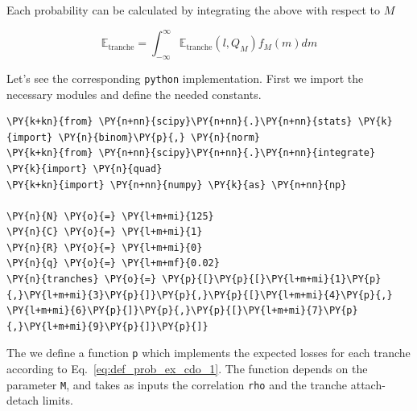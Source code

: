 Each probability can be calculated by integrating the above with respect to $M$
	
\begin{equation} \mathbb{E}_{\mathrm{tranche}} = \int_{-\infty}^{\infty}{\mathbb{E}_{\mathrm{tranche}}(l, Q_M) f_M(m)dm}\end{equation}

Let's see the corresponding \texttt{python} implementation.
First we import the necessary modules and define the needed constants.

\begin{tcolorbox}[breakable, size=fbox, boxrule=1pt, pad at break*=1mm,colback=cellbackground, colframe=cellborder]
\begin{Verbatim}[commandchars=\\\{\}]
\PY{k+kn}{from} \PY{n+nn}{scipy}\PY{n+nn}{.}\PY{n+nn}{stats} \PY{k}{import} \PY{n}{binom}\PY{p}{,} \PY{n}{norm}
\PY{k+kn}{from} \PY{n+nn}{scipy}\PY{n+nn}{.}\PY{n+nn}{integrate} \PY{k}{import} \PY{n}{quad}
\PY{k+kn}{import} \PY{n+nn}{numpy} \PY{k}{as} \PY{n+nn}{np}
	
\PY{n}{N} \PY{o}{=} \PY{l+m+mi}{125}
\PY{n}{C} \PY{o}{=} \PY{l+m+mi}{1}
\PY{n}{R} \PY{o}{=} \PY{l+m+mi}{0}
\PY{n}{q} \PY{o}{=} \PY{l+m+mf}{0.02}
\PY{n}{tranches} \PY{o}{=} \PY{p}{[}\PY{p}{[}\PY{l+m+mi}{1}\PY{p}{,}\PY{l+m+mi}{3}\PY{p}{]}\PY{p}{,}\PY{p}{[}\PY{l+m+mi}{4}\PY{p}{,} \PY{l+m+mi}{6}\PY{p}{]}\PY{p}{,}\PY{p}{[}\PY{l+m+mi}{7}\PY{p}{,}\PY{l+m+mi}{9}\PY{p}{]}\PY{p}{]}
\end{Verbatim}
\end{tcolorbox}

The we define a function \texttt{p} which implements the expected losses for each tranche according to Eq.~\ref{eq:def_prob_ex_cdo_1}.
The function depends on the parameter \texttt{M}, and takes as inputs the correlation \texttt{rho} and the tranche attach-detach limits.
	
